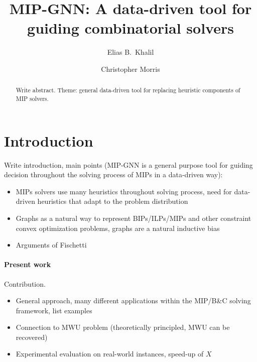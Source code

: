 \documentclass[11pt, DIV=12]{scrartcl}
\theoremstyle{definition}
\begin{document}
\title{MIP-GNN: A data-driven tool for guiding combinatorial solvers}
\author[1]{Elias B.~Khalil}
\author[2]{Christopher Morris}

\date{\vspace{-30pt}}

\maketitle

\begin{abstract}
Write abstract. Theme: general data-driven tool for replacing heuristic components of MIP solvers.	
	

\end{abstract}

\section{Introduction}
Write introduction, main points (MIP-GNN is a general purpose tool for guiding decision throughout the solving process of MIPs in a data-driven way):
\begin{itemize}
	\item MIPs solvers use many heuristics throughout solving process, need for data-driven heuristics that adapt to the problem distribution
	\item Graphs as a natural way to represent BIPs/ILPs/MIPs and other constraint convex optimization problems, graphs are a natural inductive bias
	\item Arguments of Fischetti 
\end{itemize}

\paragraph{Present work} Contribution.
\begin{itemize}
	\item General approach, many different applications within the MIP/B\&C solving framework, list examples
	\item Connection to MWU problem (theoretically principled, MWU can be recovered)
	\item Experimental evaluation on real-world instances, speed-up of $X$
\end{itemize}
\end{document}
